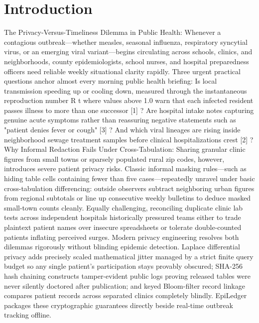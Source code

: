 \documentclass[10pt,letterpaper]{article}
\begin{document}
\section{Introduction}
The Privacy-Versus-Timeliness Dilemma in Public Health: Whenever a contagious outbreak---whether measles, seasonal influenza, respiratory syncytial virus, or an emerging viral variant---begins circulating across schools, clinics, and neighborhoods, county epidemiologists, school nurses, and hospital preparedness officers need reliable weekly situational clarity rapidly. Three urgent practical questions anchor almost every morning public health briefing: Is local transmission speeding up or cooling down, measured through the instantaneous reproduction number R t where values above 1.0 warn that each infected resident passes illness to more than one successor [1] ? Are hospital intake notes capturing genuine acute symptoms rather than reassuring negative statements such as "patient denies fever or cough" [3] ? And which viral lineages are rising inside neighborhood sewage treatment samples before clinical hospitalizations crest [2] ? Why Informal Redaction Fails Under Cross-Tabulation: Sharing granular clinic figures from small towns or sparsely populated rural zip codes, however, introduces severe patient privacy risks. Classic informal masking rules---such as hiding table cells containing fewer than five cases---repeatedly unravel under basic cross-tabulation differencing: outside observers subtract neighboring urban figures from regional subtotals or line up consecutive weekly bulletins to deduce masked small-town counts cleanly. Equally challenging, reconciling duplicate clinic lab tests across independent hospitals historically pressured teams either to trade plaintext patient names over insecure spreadsheets or tolerate double-counted patients inflating perceived surges. Modern privacy engineering resolves both dilemmas rigorously without blinding epidemic detection. Laplace differential privacy adds precisely scaled mathematical jitter managed by a strict finite query budget so any single patient's participation stays provably obscured; SHA-256 hash chaining constructs tamper-evident public logs proving released tables were never silently doctored after publication; and keyed Bloom-filter record linkage compares patient records across separated clinics completely blindly. EpiLedger packages these cryptographic guarantees directly beside real-time outbreak tracking offline.
\end{document}
